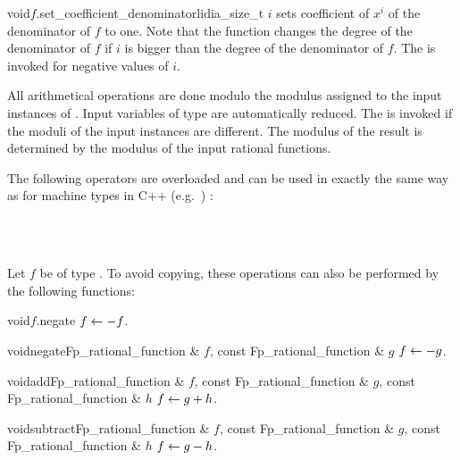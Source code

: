 \begin{fcode}{void}{$f$.set_coefficient_denominator}{lidia_size_t $i$}
  sets coefficient of $x^i$ of the denominator of $f$ to one.  Note that the function changes
  the degree of the denominator of $f$ if $i$ is bigger than the degree of the denominator of
  $f$.  The \LEH is invoked for negative values of $i$.
\end{fcode}



\ARTH

All arithmetical operations are done modulo the modulus assigned to the input instances of
.  Input variables of type  are automatically reduced.
The \LEH is invoked if the moduli of the input instances are different.  The modulus of the
result is determined by the modulus of the input rational functions.

The following operators are overloaded and can be used in exactly the same way
as for machine types in C++ (e.g.~) :

\begin{center}
\\
\\
\end{center}

Let $f$ be of type .  To avoid copying, these operations can also be
performed by the following functions:

\begin{fcode}{void}{$f$.negate}{}
  $f \leftarrow -f$.
\end{fcode}

\begin{fcode}{void}{negate}{Fp_rational_function & $f$, const Fp_rational_function & $g$}
  $f \leftarrow -g$.
\end{fcode}

\begin{fcode}{void}{add}{Fp_rational_function & $f$, const Fp_rational_function & $g$,
    const Fp_rational_function & $h$}%
  $f \leftarrow g + h$.
\end{fcode}

\begin{fcode}{void}{subtract}{Fp_rational_function & $f$, const Fp_rational_function & $g$,
    const Fp_rational_function & $h$}%
  $f \leftarrow g - h$.
\end{fcode}

